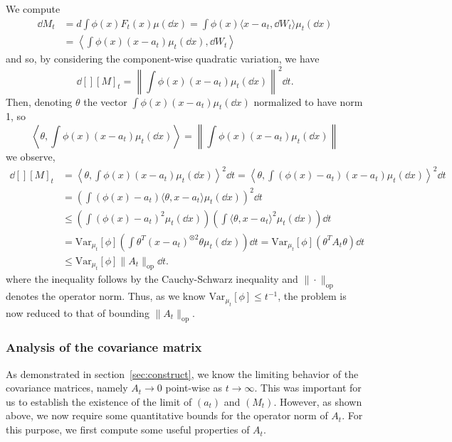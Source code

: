 We compute
\begin{align*}
  \dd M_t & = d \int \phi(x) F_t(x) \mu(\dd x) = \int \phi(x) \langle x - a_t, \dd W_t \rangle \mu_t(\dd x)\\
  & = \left\langle \int \phi(x)(x - a_t)\mu_t(\dd x), \dd W_t\right\rangle
\end{align*}
and so, by considering the component-wise quadratic variation, we have
\begin{equation}\label{eq:diff_qvar}
  \dd[] [M]_t = \left\| \int \phi(x)(x - a_t)\mu_t(\dd x) \right\|^2 \dd t.
\end{equation}
Then, denoting \(\theta\) the vector \(\int \phi(x)(x - a_t)\mu_t(\dd x)\) normalized to have norm 1, so 
\[\left\langle \theta, \int \phi(x)(x - a_t)\mu_t(\dd x)\right\rangle = \left\|\int \phi(x)(x - a_t)\mu_t(\dd x)\right\|\]
we observe,
\begin{equation}\label{eq:red_a}
  \begin{split}
    \dd[] [M]_t & = \left\langle \theta, \int \phi(x)(x - a_t)\mu_t(\dd x)\right\rangle^2 \dd t
      = \left\langle \theta, \int (\phi(x) - a_t)(x - a_t)\mu_t(\dd x)\right\rangle^2 \dd t\\
    & = \left(\int (\phi(x) - a_t) \langle \theta, x - a_t\rangle \mu_t(\dd x)\right)^2 \dd t\\
    & \le \left(\int (\phi(x) - a_t)^2 \mu_t(\dd x)\right) \left(\int \langle \theta, x - a_t\rangle^2 \mu_t(\dd x)\right) \dd t\\
    & = \text{Var}_{\mu_t}[\phi] \left(\int \theta^T (x - a_t)^{\otimes 2} \theta \mu_t(\dd x)\right) \dd t
      = \text{Var}_{\mu_t}[\phi] (\theta^T A_t \theta)\dd t\\ 
    & \le \text{Var}_{\mu_t}[\phi] \|A_t\|_{\text{op}} \dd t.
  \end{split}
\end{equation}
where the inequality follows by the Cauchy-Schwarz inequality and \(\|\cdot\|_{\text{op}}\) denotes the operator norm. 
Thus, as we know \(\text{Var}_{\mu_t}[\phi] \le t^{-1}\), the problem is now reduced to that of
bounding \(\|A_t\|_{\text{op}}\).

\subsubsection{Analysis of the covariance matrix}

As demonstrated in section~\ref{sec:construct}, we know the limiting behavior of the covariance matrices, namely 
\(A_t \to 0\) point-wise as \(t \to \infty\). This was important for us to establish the existence of the limit 
of \((a_t)\) and \((M_t)\). However, as shown above, we now require some quantitative bounds for the operator 
norm of \(A_t\). For this purpose, we first compute some useful properties of \(A_t\).

